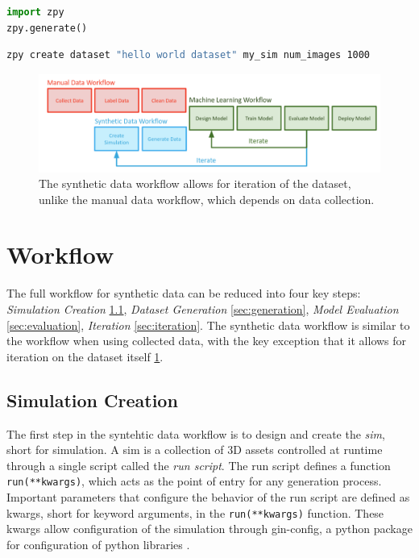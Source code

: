 \documentclass{article}
\begin{document}
\begin{lstlisting}[language=Python,caption={Generating a dataset using the zpy python API.},label={lst:api}]
import zpy
zpy.generate()
\end{lstlisting}

\begin{lstlisting}[language=bash,caption={Generating a dataset using the zpy CLI},label={lst:cli}]
zpy create dataset "hello world dataset" my_sim num_images 1000
\end{lstlisting}

\begin{figure}
	\centering
	\includegraphics[width=\textwidth]{workflow.png}
	\caption{The synthetic data workflow allows for iteration of the dataset, unlike the manual data workflow, which depends on data collection.}
	\label{fig:workflow}
\end{figure}

\section{Workflow}
\label{sec:workflow}

The full workflow for synthetic data can be reduced into four key steps: \emph{Simulation Creation} \ref{sec:worflowsimcreation}, \emph{Dataset Generation} \ref{sec:generation}, \emph{Model Evaluation} \ref{sec:evaluation}, \emph{Iteration} \ref{sec:iteration}. The synthetic data workflow is similar to the workflow when using collected data, with the key exception that it allows for iteration on the dataset itself \ref{fig:workflow}.

\subsection{Simulation Creation}
\label{sec:worflowsimcreation}

The first step in the syntehtic data workflow is to design and create the \emph{sim}, short for simulation. A sim is a collection of 3D assets controlled at runtime through a single script called the \emph{run script}. The run script defines a function \lstinline{run(**kwargs)}, which acts as the point of entry for any generation process. Important parameters that configure the behavior of the run script are defined as kwargs, short for keyword arguments, in the \lstinline{run(**kwargs)} function. These kwargs allow configuration of the simulation through gin-config, a python package for configuration of python libraries \cite{ginconfig}.
\end{document}
